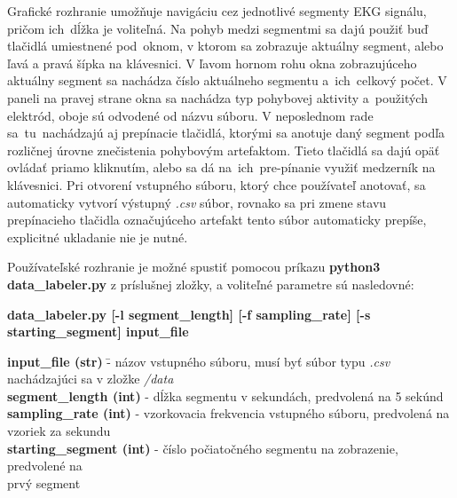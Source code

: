 Grafické rozhranie umožňuje navigáciu cez jednotlivé segmenty EKG signálu, pričom ich~dĺžka je voliteľná. Na pohyb medzi segmentmi sa dajú použiť buď tlačidlá umiestnené pod~oknom, v ktorom sa zobrazuje aktuálny segment, alebo ľavá a pravá šípka na klávesnici. V ľavom hornom rohu okna zobrazujúceho aktuálny segment sa nachádza číslo aktuálneho segmentu a~ich~celkový počet. V paneli na pravej strane okna sa nachádza typ pohybovej aktivity a~použitých elektród, oboje sú odvodené od názvu súboru. V neposlednom rade sa~tu~nachádzajú aj prepínacie tlačidlá, ktorými sa anotuje daný segment podľa rozličnej úrovne znečistenia pohybovým artefaktom. Tieto tlačidlá sa dajú opäť ovládať priamo kliknutím, alebo sa dá na~ich~pre-pínanie využiť medzerník na klávesnici. Pri otvorení vstupného súboru, ktorý chce používateľ anotovať, sa automaticky vytvorí výstupný \textit{.csv} súbor, rovnako sa pri zmene stavu prepínacieho tlačidla označujúceho artefakt tento súbor automaticky prepíše, explicitné ukladanie nie je nutné. 

Používateľské rozhranie je možné spustiť pomocou príkazu \textbf{python3 data\_labeler.py} z príslušnej zložky, a voliteľné parametre sú nasledovné:

 \noindent \textbf{data\_labeler.py [-l segment\_length] [-f sampling\_rate] [-s starting\_segment] input\_file}
 
\begin{tabbing}
    \indent \textbf{input\_file (str)} \quad\quad\quad\quad \= - názov vstupného súboru, musí byť súbor typu \textit{.csv}\\
                                                            \> nachádzajúci sa v zložke \textit{/data}\\
    \indent \textbf{segment\_length (int)}                  \> - dĺžka segmentu v sekundách, predvolená na 5 sekúnd\\
    \indent \textbf{sampling\_rate (int)}                   \> - vzorkovacia frekvencia vstupného súboru, predvolená na\\
                                                             vzoriek za sekundu\\
    \indent \textbf{starting\_segment (int)}                \> - číslo počiatočného segmentu na zobrazenie, predvolené na\\
                                                            \> prvý segment\\
\end{tabbing}

\newpage

